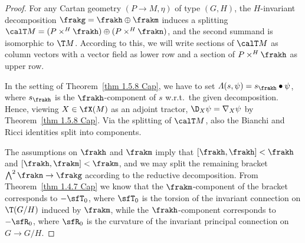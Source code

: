 \begin{proof}
    For any Cartan geometry $(P\to M,\eta)$ of type $(G,H)$, the $H$-invariant decomposition $\frakg=\frakh\oplus\frakm$ induces a splitting $\calT M=(P\times^H\frakh)\oplus(P\times^H \frakn)$, and the second summand is isomorphic to $\T M$. According to this, we will write sections of $\calT M$ as column vectors with a vector field as lower row and a section of $P\times^H \frakh$ as upper row.

    In the setting of Theorem~\ref{thm 1.5.8 Cap}, we have to set $\varLambda(s,\psi)=s_\frakh\bullet \psi$, where $s_\frakh$ is the $\frakh$-component of $s$ w.r.t.\ the given decomposition. Hence, viewing $X\in\fX(M)$ as an adjoint tractor, $\D_X \psi=\nabla_X\psi$ by Theorem~\ref{thm 1.5.8 Cap}. Via the splitting of $\calT M$, also the Bianchi and Ricci identities split into components. 

    The assumptions on $\frakh$ and $\frakm$ imply that $[\frakh,\frakh]<\frakh$ and $[\frakh,\frakm]<\frakm$, and we may split the remaining bracket $\bigwedge\nolimits^2\frakn\to \frakg$ according to the reductive decomposition. From Theorem~\ref{thm 1.4.7 Cap} we know that the $\frakm$-component of the bracket corresponds to $-\sfT_0$, where $\sfT_0$ is the torsion of the invariant connection on $\T(G\slash H)$ induced by $\frakm$, while the $\frakh$-component corresponds to $-\sfR_0$, where $\sfR_0$ is the curvature of the invariant principal connection on $G\to G\slash H$.


\end{proof}
